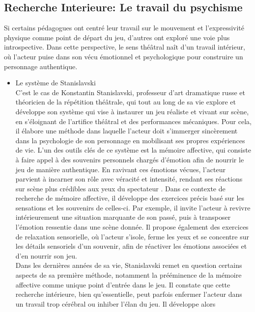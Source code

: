 \subsection{Recherche Interieure: Le travail du psychisme} 
Si certains pédagogues ont centré leur travail sur le mouvement et l’expressivité physique 
comme point de départ du jeu, d'autres ont exploré une voie plus introspective. Dans cette 
perspective, le sens théâtral naît d’un travail intérieur, où l’acteur puise dans son vécu 
émotionnel et psychologique pour construire un personnage authentique.
\begin{itemize}
    \item Le système de Stanislavski
    \\ 
    C'est le cas de Konstantin Stanislavski, professeur d'art dramatique russe et théoricien de la 
    répétition théâtrale, qui tout au long de sa vie explore et développe son système qui
    vise à instaurer un jeu réaliste et vivant sur scène, en s’éloignant de l’artifice théâtral et 
    des performances mécaniques. Pour cela, il élabore une méthode dans laquelle l’acteur doit s’immerger
    sincèrement dans la psychologie de son personnage en mobilisant ses propres expériences de vie. L’un 
    des outils clés de ce système est la mémoire affective, qui consiste à faire appel à des souvenirs
    personnels chargés d’émotion afin de nourrir le jeu de manière authentique. En ravivant ces émotions vécues, 
    l’acteur parvient à incarner son rôle avec véracité et intensité, rendant ses réactions sur scène plus crédibles
    aux yeux du spectateur \cite{Stanislavski}.
    Dans ce contexte de recherche de mémoire affective, il développe des exercices précis basé sur les sensations et les 
    souvenirs de celles-ci. Par exemple, il invite l’acteur à revivre intérieurement une situation marquante de son passé, 
    puis à transposer l’émotion ressentie dans une scène donnée. Il propose également des exercices de relaxation sensorielle,
    où l’acteur s’isole, ferme les yeux et se concentre sur les détails sensoriels d’un souvenir, afin de réactiver les 
    émotions associées et d’en nourrir son jeu.  
    \\
    Dans les dernières années de sa vie, Stanislavski remet en question certains aspects de sa première méthode, notamment
    la prééminence de la mémoire affective comme unique point d’entrée dans le jeu. Il constate que cette recherche intérieure, 
    bien qu’essentielle, peut parfois enfermer l’acteur dans un travail trop cérébral ou inhiber l’élan du jeu. Il développe alors 

\end{itemize}
